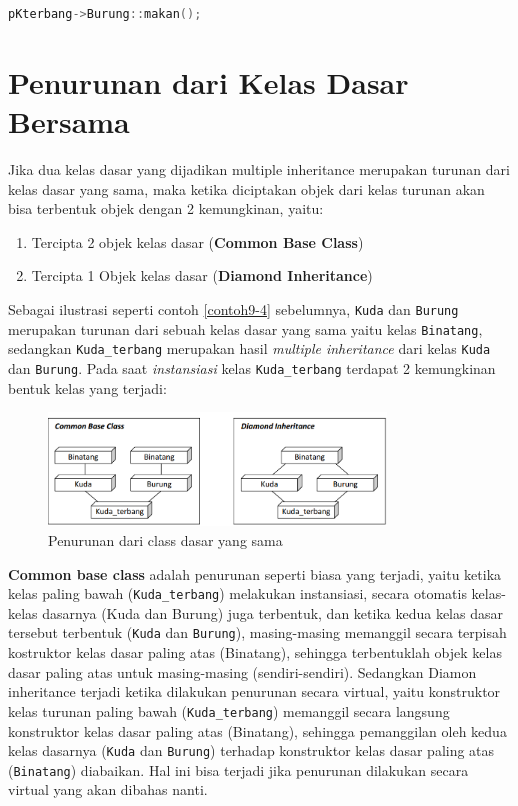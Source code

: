 \begin{lstlisting}[language=c++, numbers=none]
pKterbang->Burung::makan();
\end{lstlisting}

\section{Penurunan dari Kelas Dasar
Bersama}\label{penurunan-dari-kelas-dasar-bersama}

Jika dua kelas dasar yang dijadikan multiple inheritance merupakan
turunan dari kelas dasar yang sama, maka ketika diciptakan objek dari
kelas turunan akan bisa terbentuk objek dengan 2 kemungkinan, yaitu:

\begin{enumerate}


\item
  Tercipta 2 objek kelas dasar (\textbf{Common Base Class})
\item
  Tercipta 1 Objek kelas dasar (\textbf{Diamond Inheritance})
\end{enumerate}

Sebagai ilustrasi seperti contoh \ref{contoh9-4} sebelumnya, \texttt{Kuda} dan
\texttt{Burung} merupakan turunan dari sebuah kelas dasar yang sama
yaitu kelas \texttt{Binatang}, sedangkan \texttt{Kuda\_terbang}
merupakan hasil \emph{multiple inheritance} dari kelas \texttt{Kuda} dan
\texttt{Burung}. Pada saat \emph{instansiasi} kelas
\texttt{Kuda\_terbang} terdapat 2 kemungkinan bentuk kelas yang terjadi:

\begin{figure}[htbp]
\centering
\includegraphics[width=0.8\textwidth]{../manuscript/images/capture9-3}
\caption{Penurunan dari class dasar yang sama}
\end{figure}

\textbf{Common base class} adalah penurunan seperti biasa yang terjadi,
yaitu ketika kelas paling bawah (\texttt{Kuda\_terbang}) melakukan
instansiasi, secara otomatis kelas-kelas dasarnya (Kuda dan Burung) juga
terbentuk, dan ketika kedua kelas dasar tersebut terbentuk
(\texttt{Kuda} dan \texttt{Burung}), masing-masing memanggil secara
terpisah kostruktor kelas dasar paling atas (Binatang), sehingga
terbentuklah objek kelas dasar paling atas untuk masing-masing
(sendiri-sendiri). Sedangkan Diamon inheritance terjadi ketika dilakukan
penurunan secara virtual, yaitu konstruktor kelas turunan paling bawah
(\texttt{Kuda\_terbang}) memanggil secara langsung konstruktor kelas
dasar paling atas (Binatang), sehingga pemanggilan oleh kedua kelas
dasarnya (\texttt{Kuda} dan \texttt{Burung}) terhadap konstruktor kelas
dasar paling atas (\texttt{Binatang}) diabaikan. Hal ini bisa terjadi
jika penurunan dilakukan secara virtual yang akan dibahas nanti.

